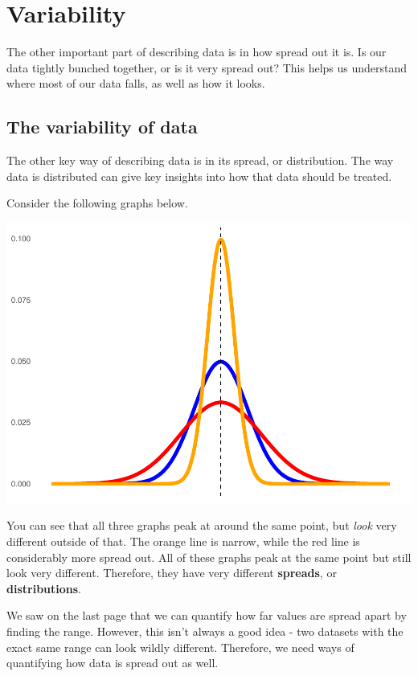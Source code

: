 \documentclass[
]{book}
\begin{document}
\hypertarget{variability}{%
\section{Variability}\label{variability}}

The other important part of describing data is in how spread out it is. Is our data tightly bunched together, or is it very spread out? This helps us understand where most of our data falls, as well as how it looks.

\hypertarget{the-variability-of-data}{%
\subsection{The variability of data}\label{the-variability-of-data}}

The other key way of describing data is in its spread, or distribution. The way data is distributed can give key insights into how that data should be treated.

Consider the following graphs below.

\begin{center}\includegraphics{_main_files/figure-latex/unnamed-chunk-67-1} \end{center}

You can see that all three graphs peak at around the same point, but \emph{look} very different outside of that. The orange line is narrow, while the red line is considerably more spread out. All of these graphs peak at the same point but still look very different. Therefore, they have very different \textbf{spreads}, or \textbf{distributions}.

We saw on the last page that we can quantify how far values are spread apart by finding the range. However, this isn't always a good idea - two datasets with the exact same range can look wildly different. Therefore, we need ways of quantifying how data is spread out as well.
\end{document}
